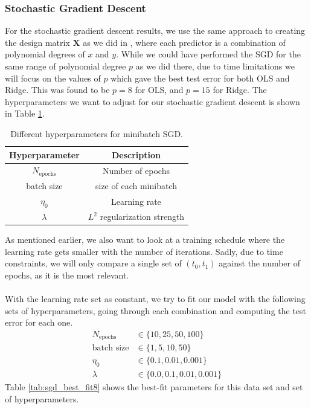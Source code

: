 \documentclass[a4paper]{article}
\newcommand\red[1]{\textcolor{red}{\textbf{#1}}}
\newcommand{\XX}{\mathbf{X}}
\begin{document}
\subsubsection{Stochastic Gradient Descent}
For the stochastic gradient descent results, we use the same approach to creating the design matrix $\XX$ as we did in \cite{Github1}, where each predictor is a combination of polynomial degrees of $x$ and $y$. While we could have performed the SGD for the same range of polynomial degree $p$ as we did there, due to time limitations we will focus on the values of $p$ which gave the best test error for both OLS and Ridge. This was found to be $p=8$ for OLS, and $p=15$ for Ridge. The hyperparameters we want to adjust for our stochastic gradient descent is shown in Table \ref{tab:hyper_sgd}.%
\begin{table}[H]
  \centering
  \caption{Different hyperparameters for minibatch SGD.}
  \label{tab:hyper_sgd}
  \begin{tabular}{c|c}
    \hline\hline
    \textbf{Hyperparameter} & \textbf{Description}\\\hline
    $N_{\text{epochs}}$ & Number of epochs \\
    batch size & size of each minibatch \\
    $\eta_0$ & Learning rate \\
    $\lambda$ & $L^2$ regularization strength
    \end{tabular}
\end{table}
As mentioned earlier, we also want to look at a training schedule where the learning rate gets smaller with the number of iterations. Sadly, due to time constraints, we will only compare a single set of $(t_0, t_1)$ against the number of epochs, as it is the most relevant. %
\\\\
With the learning rate set as constant, we try to fit our model with the following sets of hyperparameters, going through each combination and computing the test error for each one.
\begin{align*}
	N_{\text{epochs}} &\in \{10, 25, 50, 100\}\\
	\text{batch size} &\in \{1, 5, 10, 50\}\\
	\eta_0 &\in \{0.1, 0.01, 0.001\}\\
	\lambda &\in \{0.0, 0.1, 0.01, 0.001\}
\end{align*}
Table \ref{tab:sgd_best_fit8} shows the best-fit parameters for this data set and set of hyperparameters.
\end{document}
